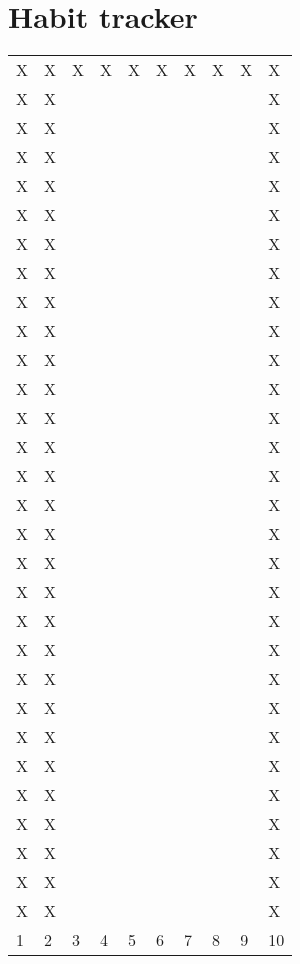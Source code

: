 \documentclass[10pt,a4paper]{article}
\begin{document}
\section{Habit tracker}
\begin{table}[htp]
\begin{tabular}{llllllllll}
X & X & X & X & X & X & X & X & X & X \\
X & X &   &   &   &   &   &   &   & X \\
X & X &   &   &   &   &   &   &   & X \\
X & X &   &   &   &   &   &   &   & X \\
X & X &   &   &   &   &   &   &   & X \\
X & X &   &   &   &   &   &   &   & X \\
X & X &   &   &   &   &   &   &   & X \\
X & X &   &   &   &   &   &   &   & X \\
X & X &   &   &   &   &   &   &   & X \\
X & X &   &   &   &   &   &   &   & X \\
X & X &   &   &   &   &   &   &   & X \\
X & X &   &   &   &   &   &   &   & X \\
X & X &   &   &   &   &   &   &   & X \\
X & X &   &   &   &   &   &   &   & X \\
X & X &   &   &   &   &   &   &   & X \\
X & X &   &   &   &   &   &   &   & X \\
X & X &   &   &   &   &   &   &   & X \\
X & X &   &   &   &   &   &   &   & X \\
X & X &   &   &   &   &   &   &   & X \\
X & X &   &   &   &   &   &   &   & X \\
X & X &   &   &   &   &   &   &   & X \\
X & X &   &   &   &   &   &   &   & X \\
X & X &   &   &   &   &   &   &   & X \\
X & X &   &   &   &   &   &   &   & X \\
X & X &   &   &   &   &   &   &   & X \\
X & X &   &   &   &   &   &   &   & X \\
X & X &   &   &   &   &   &   &   & X \\
X & X &   &   &   &   &   &   &   & X \\
X & X &   &   &   &   &   &   &   & X \\
X & X &   &   &   &   &   &   &   & X \\
1 & 2 & 3 & 4 & 5 & 6 & 7 & 8 & 9 & 10 \\
\end{tabular}
\end{table}
\end{document}
